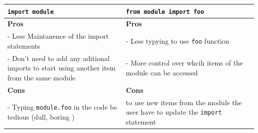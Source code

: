 \documentclass[]{book}
\begin{document}
\begin{longtable}[]{@{}ll@{}}
\toprule
\begin{minipage}[b]{0.40\columnwidth}\raggedright
\texttt{import\ module}\strut
\end{minipage} & \begin{minipage}[b]{0.54\columnwidth}\raggedright
\texttt{from\ module\ import\ foo}\strut
\end{minipage}\tabularnewline
\midrule
\endhead
\begin{minipage}[t]{0.40\columnwidth}\raggedright
\textbf{Pros}\strut
\end{minipage} & \begin{minipage}[t]{0.54\columnwidth}\raggedright
\textbf{Pros}\strut
\end{minipage}\tabularnewline
\begin{minipage}[t]{0.40\columnwidth}\raggedright
- Less Maintanence of the import statements\strut
\end{minipage} & \begin{minipage}[t]{0.54\columnwidth}\raggedright
- Less typying to use \texttt{foo} function\strut
\end{minipage}\tabularnewline
\begin{minipage}[t]{0.40\columnwidth}\raggedright
- Don't need to add any aditional imports to start using another item from the same module\strut
\end{minipage} & \begin{minipage}[t]{0.54\columnwidth}\raggedright
- More control over whcih items of the module can be accessed\strut
\end{minipage}\tabularnewline
\begin{minipage}[t]{0.40\columnwidth}\raggedright
\textbf{Cons}\strut
\end{minipage} & \begin{minipage}[t]{0.54\columnwidth}\raggedright
\textbf{Cons}\strut
\end{minipage}\tabularnewline
\begin{minipage}[t]{0.40\columnwidth}\raggedright
- Typing \texttt{module.foo} in the code be tedious (dull, boring )\strut
\end{minipage} & \begin{minipage}[t]{0.54\columnwidth}\raggedright
to use new items from the module the user have to update the \texttt{import} statement\strut
\end{minipage}\tabularnewline
\bottomrule
\end{longtable}
\end{document}

